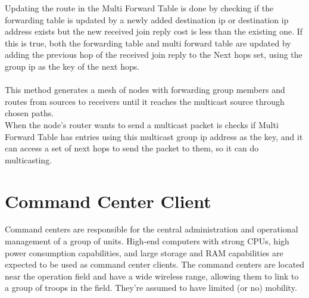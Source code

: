 Updating the route in the Multi Forward Table is done by checking if the forwarding table is updated by a newly added destination \acrshort{ip} or destination \acrshort{ip} address exists but the new received join reply cost is less than the existing one. If this is true, both the forwarding table and multi forward table are updated by adding the previous hop of the received join reply to the Next hops set, using the group \acrshort{ip} as the key of the next hops.
\\
\\
This method generates a mesh of nodes with forwarding group members and routes from sources to receivers until it reaches the multicast source through chosen paths.
\\
When the node's router wants to send a multicast packet is checks if Multi Forward Table has entries using this multicast group \acrshort{ip} address as the key, and it can access a set of next hops to send the packet to them, so it can do multicasting.

\section{Command Center Client}
Command centers are responsible for the central administration and operational management of a group of units. High-end computers with strong CPUs, high power consumption capabilities, and large storage and RAM capabilities are expected to be used as command center clients. The command centers are located near the operation field and have a wide wireless range, allowing them to link to a group of troops in the field. They're assumed to have limited (or no) mobility.


